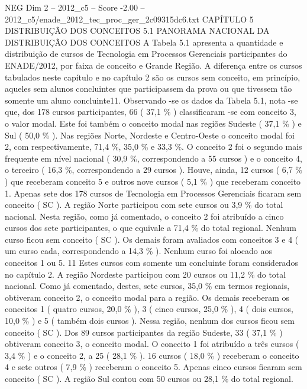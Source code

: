 \begin{textsample}{NEG Dim 2 – 2012\_c5 – Score -2.00 – 2012\_c5/enade\_2012\_tec\_proc\_ger\_2c09315dc6.txt}  \label{ex:f2_neg_073}
CAPÍTULO 5 DISTRIBUIÇÃO DOS CONCEITOS 5.1 PANORAMA NACIONAL DA DISTRIBUIÇÃO DOS CONCEITOS A Tabela 5.1 apresenta a quantidade e distribuição de cursos de Tecnologia em Processos Gerenciais participantes do ENADE/2012, por faixa de conceito e Grande Região.
A diferença entre os cursos tabulados neste capítulo e no capítulo 2 são os cursos sem conceito, em princípio, aqueles sem alunos concluintes que participassem da prova ou que tivessem tão somente um aluno concluinte11.
Observando -se os dados da Tabela 5.1, nota -se que, dos 178 cursos participantes, 66 ( 37,1 \% ) classificaram -se com conceito 3, o valor modal.
Este foi também o conceito modal nas regiões Sudeste ( 37,1 \% ) e Sul ( 50,0 \% ).
Nas regiões Norte, Nordeste e Centro-Oeste o conceito modal foi 2, com respectivamente, 71,4 \%, 35,0 \% e 33,3 \%.
O conceito 2 foi o segundo mais frequente em nível nacional ( 30,9 \%, correspondendo a 55 cursos ) e o conceito 4, o terceiro ( 16,3 \%, correspondendo a 29 cursos ).
Houve, ainda, 12 cursos ( 6,7 \% ) que receberam conceito 5 e outros nove cursos ( 5,1 \% ) que receberam conceito 1.
Apenas sete dos 178 cursos de Tecnologia em Processos Gerenciais ficaram sem conceito ( SC ).
A região Norte participou com sete cursos ou 3,9 \% do total nacional.
Nesta região, como já comentado, o conceito 2 foi atribuído a cinco cursos dos sete participantes, o que equivale a 71,4 \% do total regional.
Nenhum curso ficou sem conceito ( SC ).
Os demais foram avaliados com conceitos 3 e 4 ( um curso cada, correspondendo a 14,3 \% ).
Nenhum curso foi alocado aos conceitos 1 ou 5. 11 Estes cursos com somente um concluinte foram considerados no capítulo 2.
A região Nordeste participou com 20 cursos ou 11,2 \% do total nacional.
Como já comentado, destes, sete cursos, 35,0 \% em termos regionais, obtiveram conceito 2, o conceito modal para a região.
Os demais receberam os conceitos 1 ( quatro cursos, 20,0 \% ), 3 ( cinco cursos, 25,0 \% ), 4 ( dois cursos, 10,0 \% ) e 5 ( também dois cursos ).
Nessa região, nenhum dos cursos ficou sem conceito ( SC ).
Dos 89 cursos participantes da região Sudeste, 33 ( 37,1 \% ) obtiveram conceito 3, o conceito modal.
O conceito 1 foi atribuído a três cursos ( 3,4 \% ) e o conceito 2, a 25 ( 28,1 \% ). 16 cursos ( 18,0 \% ) receberam o conceito 4 e sete outros ( 7,9 \% ) receberam o conceito 5.
Apenas cinco cursos ficaram sem conceito ( SC ).
A região Sul contou com 50 cursos ou 28,1 \% do total regional.

\end{textsample}
